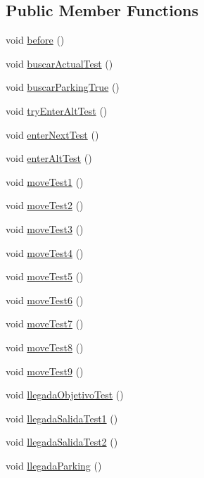 \subsection*{Public Member Functions}
\begin{DoxyCompactItemize}
\item 
void \mbox{\hyperlink{classtest_1_1_vehicles_test_a1fa47e6164330e08a89695175a6fed1c}{before}} ()
\item 
void \mbox{\hyperlink{classtest_1_1_vehicles_test_a946e0396eb3a4547d8f588408bc82a6d}{buscar\+Actual\+Test}} ()
\item 
void \mbox{\hyperlink{classtest_1_1_vehicles_test_af769f7022f74eff2bbb9a77f5aea83f8}{buscar\+Parking\+True}} ()
\item 
void \mbox{\hyperlink{classtest_1_1_vehicles_test_a7ff46f63103aef8f984b7fbb1f9857fe}{try\+Enter\+Alt\+Test}} ()
\item 
void \mbox{\hyperlink{classtest_1_1_vehicles_test_ac7b3dc490a47ed73391a0a95e8b5445c}{enter\+Next\+Test}} ()
\item 
void \mbox{\hyperlink{classtest_1_1_vehicles_test_ab0a8e244c7fbf7141c528356ce18429a}{enter\+Alt\+Test}} ()
\item 
void \mbox{\hyperlink{classtest_1_1_vehicles_test_a706455718c34d3c7bc6a0cb2917f2ebc}{move\+Test1}} ()
\item 
void \mbox{\hyperlink{classtest_1_1_vehicles_test_a300544e27feeaa4f6dad6d48f45720e9}{move\+Test2}} ()
\item 
void \mbox{\hyperlink{classtest_1_1_vehicles_test_ac6267ff4e71ba311e03c25de20196e65}{move\+Test3}} ()
\item 
void \mbox{\hyperlink{classtest_1_1_vehicles_test_acb2d255019e8718669cb5d6105fd43fa}{move\+Test4}} ()
\item 
void \mbox{\hyperlink{classtest_1_1_vehicles_test_a11f99870b0a4caa2075a2bdeaf910523}{move\+Test5}} ()
\item 
void \mbox{\hyperlink{classtest_1_1_vehicles_test_add2a427b283ac60b944e500f0c66e20b}{move\+Test6}} ()
\item 
void \mbox{\hyperlink{classtest_1_1_vehicles_test_ac0fe870f7fb0e6bd96317b5e8a9c06d0}{move\+Test7}} ()
\item 
void \mbox{\hyperlink{classtest_1_1_vehicles_test_ae80a57f1f29cea08685e8f835d0a6d63}{move\+Test8}} ()
\item 
void \mbox{\hyperlink{classtest_1_1_vehicles_test_ae9e8f3b27af5bb2a0d7b7f52da6ba833}{move\+Test9}} ()
\item 
void \mbox{\hyperlink{classtest_1_1_vehicles_test_a34624265089253eb5d45a7fcffeacd90}{llegada\+Objetivo\+Test}} ()
\item 
void \mbox{\hyperlink{classtest_1_1_vehicles_test_af6b183cd52a3b39d3e565d3e92a85487}{llegada\+Salida\+Test1}} ()
\item 
void \mbox{\hyperlink{classtest_1_1_vehicles_test_a7345ea4de2d3d0f0ebd9fd8d7701c13f}{llegada\+Salida\+Test2}} ()
\item 
void \mbox{\hyperlink{classtest_1_1_vehicles_test_a9b90c693ab518856b021096cefde1e73}{llegada\+Parking}} ()
\end{DoxyCompactItemize}

